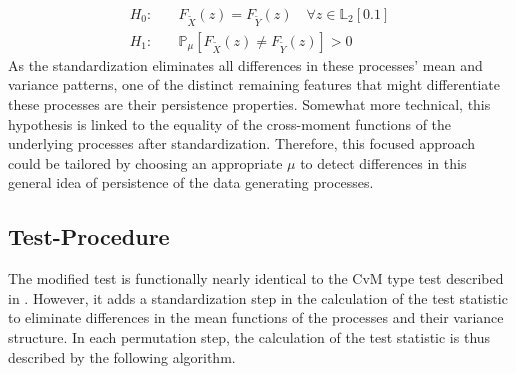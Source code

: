 \documentclass[12pt, a4paper]{article}
\theoremstyle{MAstyle} \newtheorem{assumption}{Assumption}[section]
\theoremstyle{MAstyle} \newtheorem{definition}{Definition}[section]
\theoremstyle{MAstyle} \newtheorem{theorem}{Theorem}[section]
\begin{document}
		\begin{equation}
			\begin{split}
				H_0: \quad &F_{\tilde{X}}(z) = F_{\tilde{Y}}(z) \quad \forall z \in \mathbb{L}_2[0.1] \\
				H_1: \quad &\mathbb{P}_{\mu}\left[F_{\tilde{X}}(z) \neq F_{\tilde{Y}}(z)\right] > 0
			\end{split}
		\end{equation}
		As the standardization eliminates all differences in these processes' mean and variance patterns, one of the distinct remaining features that might differentiate these processes are their persistence properties.
		Somewhat more technical, this hypothesis is linked to the equality of the cross-moment functions of the underlying processes after standardization.
		Therefore, this focused approach could be tailored by choosing an appropriate $\mu$ to detect differences in this general idea of persistence of the data generating processes. \\
		
		\subsection{Test-Procedure}\label{persistence_test}
		The modified test is functionally nearly identical to the CvM type test described in \cite{bugni_permutation_2021}. However, it adds a standardization step in the calculation of the test statistic to eliminate differences in the mean functions of the processes and their variance structure. In each permutation step, the calculation of the test statistic is thus described by the following algorithm.\\
		
\end{document}
